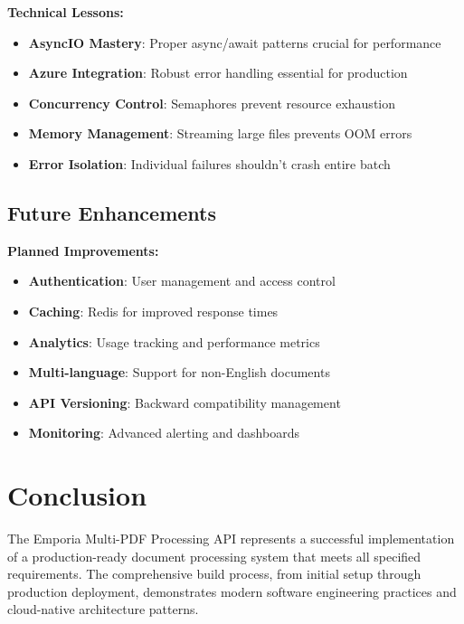 \documentclass[11pt]{article}
\begin{document}
\begin{notebox}
\textbf{Technical Lessons:}
\begin{itemize}
    \item \textbf{AsyncIO Mastery}: Proper async/await patterns crucial for performance
    \item \textbf{Azure Integration}: Robust error handling essential for production
    \item \textbf{Concurrency Control}: Semaphores prevent resource exhaustion
    \item \textbf{Memory Management}: Streaming large files prevents OOM errors
    \item \textbf{Error Isolation}: Individual failures shouldn't crash entire batch
\end{itemize}
\end{notebox}

\subsection*{Future Enhancements}

\begin{techbox}
\textbf{Planned Improvements:}
\begin{itemize}
    \item \textbf{Authentication}: User management and access control
    \item \textbf{Caching}: Redis for improved response times
    \item \textbf{Analytics}: Usage tracking and performance metrics
    \item \textbf{Multi-language}: Support for non-English documents
    \item \textbf{API Versioning}: Backward compatibility management
    \item \textbf{Monitoring}: Advanced alerting and dashboards
\end{itemize}
\end{techbox}

\section*{Conclusion}

The Emporia Multi-PDF Processing API represents a successful implementation of a production-ready document processing system that meets all specified requirements. The comprehensive build process, from initial setup through production deployment, demonstrates modern software engineering practices and cloud-native architecture patterns.
\end{document}
